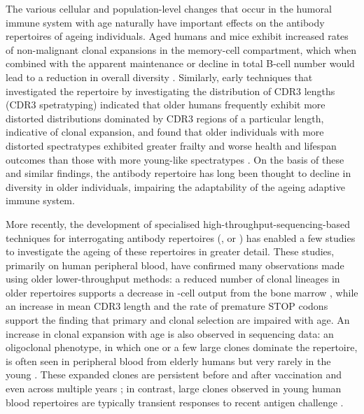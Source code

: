 The various cellular and population-level changes that occur in the humoral immune system with age naturally have important effects on the antibody repertoires of ageing individuals. Aged humans \parencite{siegrist2009extremes} and mice \parencite{dunnwalters2010bcellageing} exhibit increased rates of non-malignant clonal expansions in the memory-cell compartment, which when combined with the apparent maintenance or decline in total B-cell number would lead to a reduction in overall diversity \parencite{dunnwalters2010bcellageing}. Similarly, early techniques that investigated the repertoire by investigating the distribution of CDR3 lengths (CDR3 spetratyping) indicated that older humans frequently exhibit more distorted distributions dominated by CDR3 regions of a particular length, indicative of clonal expansion, and found that older individuals with more distorted spectratypes exhibited greater frailty and worse health and lifespan outcomes than those with more young-like spectratypes \parencite{gibson2009spectratyping}. On the basis of these and similar findings, the antibody repertoire has long been thought to decline in diversity in older individuals, impairing the adaptability of the ageing adaptive immune system.

More recently, the development of specialised high-throughput-sequencing-based techniques for interrogating antibody repertoires (\Igseq, or \igseq \parencite{weinstein2009igseq,georgiou2014promise}) has enabled a few studies to investigate the ageing of these repertoires in greater detail. These studies, primarily on human peripheral blood, have confirmed many observations made using older lower-throughput methods: a reduced number of clonal lineages in older repertoires supports a decrease in \naive-cell output from the bone marrow \parencite{jiang2013vaccine}, while an increase in mean CDR3 length \parencite{wang2014ageing} and the rate of premature STOP codons \parencite{debourcy2017ageing} support the finding that primary and clonal selection are impaired with age. An increase in clonal expansion with age is also observed in sequencing data: an oligoclonal phenotype, in which one or a few large clones dominate the repertoire, is often seen in peripheral blood from elderly humans but very rarely in the young \parencite{wang2014ageing,debourcy2017ageing}. These expanded clones are persistent before and after vaccination \parencite{debourcy2017ageing} and even across multiple years \parencite{wang2014ageing}; in contrast, large clones observed in young human blood repertoires are typically transient responses to recent antigen challenge \parencite{wang2014ageing}.

